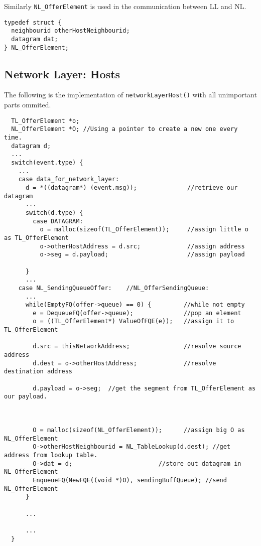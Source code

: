 Similarly \texttt{NL\_OfferElement} is used in the communication between LL and NL.
\begin{lstlisting}
typedef struct {
  neighbourid otherHostNeighbourid;
  datagram dat;
} NL_OfferElement;
\end{lstlisting}


\subsection{Network Layer: Hosts}

The following is the implementation of \texttt{networkLayerHost()} with all unimportant parts ommited.

\begin{lstlisting}
  TL_OfferElement *o;
  NL_OfferElement *O; //Using a pointer to create a new one every time.
  datagram d;
  ...
  switch(event.type) {
    ...
    case data_for_network_layer:
      d = *((datagram*) (event.msg));              //retrieve our datagram
      ...
      switch(d.type) {
        case DATAGRAM:
          o = malloc(sizeof(TL_OfferElement));     //assign little o as TL_OfferElement
          o->otherHostAddress = d.src;             //assign address
          o->seg = d.payload;                      //assign payload

      }
      ...
    case NL_SendingQueueOffer:    //NL_OfferSendingQueue:
      ...
      while(EmptyFQ(offer->queue) == 0) {         //while not empty
        e = DequeueFQ(offer->queue);              //pop an element
        o = ((TL_OfferElement*) ValueOfFQE(e));   //assign it to TL_OfferElement

        d.src = thisNetworkAddress;               //resolve source address
        d.dest = o->otherHostAddress;             //resolve destination address

        d.payload = o->seg;  //get the segment from TL_OfferElement as our payload.



        O = malloc(sizeof(NL_OfferElement));      //assign big O as NL_OfferElement
        O->otherHostNeighbourid = NL_TableLookup(d.dest); //get address from lookup table.
        O->dat = d;                        //store out datagram in NL_OfferElement
        EnqueueFQ(NewFQE((void *)O), sendingBuffQueue); //send NL_OfferElement
      }

      ...

      ...
  }
\end{lstlisting}




